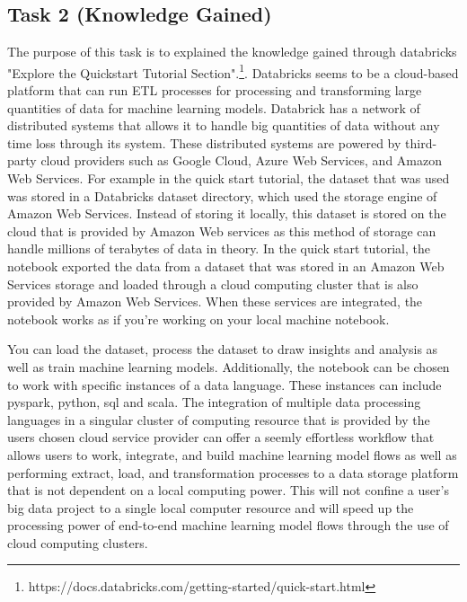 \documentclass[12pt]{article}
\begin{document}
\begin{multicols*}{2}
  \section{Task 2 (Knowledge Gained)}
  \hspace*{5mm} The purpose of this task is to explained the knowledge gained through databricks "Explore the Quickstart Tutorial Section".\footnote[1]{https://docs.databricks.com/getting-started/quick-start.html}.
  Databricks seems to be a cloud-based platform that can run ETL processes for processing and transforming large quantities of data for machine learning models. 
  Databrick has a network of distributed systems that allows it to handle big quantities of data without any time loss through its system. 
  These distributed systems are powered by third-party cloud providers such as Google Cloud, Azure Web Services, and Amazon Web Services. 
  For example in the quick start tutorial, the dataset that was used was stored in a Databricks dataset directory, which used the storage engine of Amazon Web Services. 
  Instead of storing it locally, this dataset is stored on the cloud that is provided by Amazon Web services as this method of storage can handle millions of terabytes of data in theory. 
  In the quick start tutorial, the notebook exported the data from a dataset that was stored in an Amazon Web Services storage and loaded through a cloud computing cluster 
  that is also provided by Amazon Web Services. When these services are integrated, the notebook works as if you’re working on your local machine notebook.


  \hspace*{5mm} You can load the dataset, process the dataset to draw insights and analysis as well as train machine learning models. 
  Additionally, the notebook can be chosen to work with specific instances of a data language. These instances can include pyspark, python, sql and scala. 
  The integration of multiple data processing languages in a singular cluster of computing resource that is provided by the users chosen cloud service provider can offer a seemly effortless workflow that allows users to work, 
  integrate, and build machine learning model flows as well as performing extract, load, and transformation processes to a data storage platform that is not dependent on a local computing power. 
  This will not confine a user's big data project to a single local computer resource and will speed up the processing power of end-to-end machine learning model flows through the use of cloud computing clusters.  


\end{multicols*}
\end{document}
